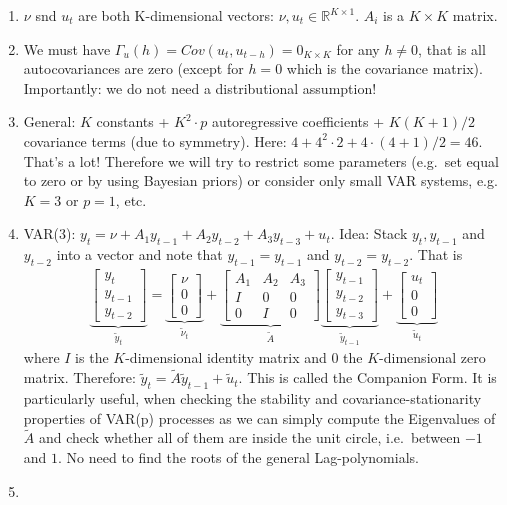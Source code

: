 \begin{enumerate}
\item \(\nu\) snd \(u_t\) are both K-dimensional vectors: \(\nu,u_t \in \mathbb{R}^{K \times 1}\).
\(A_i\) is a \(K \times K\) matrix.

\item We must have \({\Gamma_u(h)} = Cov(u_t, u_{t-h}) = 0_{K\times K}\) for any \(h\neq0\),
  that is all autocovariances are zero
  (except for \(h=0\) which is the covariance matrix).
Importantly: we do not need a distributional assumption!
	
\item General: \(K\) constants + \(K^2\cdot p\) autoregressive coefficients + \(K(K+1)/2\) covariance terms (due to symmetry).
Here: \(4+4^2\cdot2+4\cdot(4+1)/2=46\).
That's a lot!
Therefore we will try to restrict some parameters (e.g.\ set equal to zero or by using Bayesian priors)
or consider only small VAR systems, e.g. \(K=3\) or \(p=1\), etc.

\item VAR(3): \(y_t = \nu + A_1 y_{t-1} + A_2 y_{t-2} + A_3 y_{t-3} + u_t\).
Idea: Stack \(y_t, y_{t-1}\) and \(y_{t-2}\) into a vector and note that \(y_{t-1}=y_{t-1}\) and \(y_{t-2}=y_{t-2}\).
That is
\begin{align*}
\underbrace{\begin{bmatrix} y_t\\ y_{t-1} \\ y_{t-2} \end{bmatrix}}_{\widetilde{y}_t}
= \underbrace{\begin{bmatrix} \nu \\ 0 \\ 0 \end{bmatrix}}_{\widetilde{\nu}_t}
+ \underbrace{\begin{bmatrix} A_1 & A_2 & A_3 \\ I & 0 & 0\\ 0&I&0\end{bmatrix}}_{\widetilde{A}}
  \underbrace{\begin{bmatrix} y_{t-1}\\ y_{t-2} \\ y_{t-3} \end{bmatrix}}_{\widetilde{y}_{t-1}}
+ \underbrace{\begin{bmatrix} u_t \\ 0 \\ 0\end{bmatrix}}_{\widetilde{u}_t}
\end{align*}
where \(I\) is the \(K\)-dimensional identity matrix and \(0\) the \(K\)-dimensional zero matrix.
Therefore: \(\widetilde{y}_t = \widetilde{A} \widetilde{y}_{t-1} + \widetilde{u}_t\).
This is called the Companion Form.
It is particularly useful, when checking the stability and covariance-stationarity properties of VAR(p) processes 
as we can simply compute the Eigenvalues of \(\widetilde{A}\)
and check whether all of them are inside the unit circle, i.e.\ between \(-1\) and \(1\).
No need to find the roots of the general Lag-polynomials.

\item 
\end{enumerate}